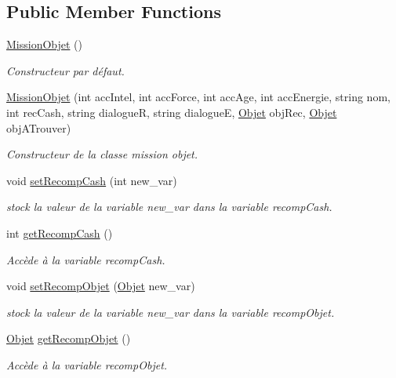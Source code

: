 \subsection*{Public Member Functions}
\begin{DoxyCompactItemize}
\item 
\hyperlink{class_mission_objet_a318a1e74b1c2fb4a5c4f9e8c1307cb5d}{Mission\-Objet} ()
\begin{DoxyCompactList}\small\item\em Constructeur par défaut. \end{DoxyCompactList}\item 
\hyperlink{class_mission_objet_a3622eac0551933b75a5d11c93ceba22f}{Mission\-Objet} (int acc\-Intel, int acc\-Force, int acc\-Age, int acc\-Energie, string nom, int rec\-Cash, string dialogue\-R, string dialogue\-E, \hyperlink{class_objet}{Objet} obj\-Rec, \hyperlink{class_objet}{Objet} obj\-A\-Trouver)
\begin{DoxyCompactList}\small\item\em Constructeur de la classe mission objet. \end{DoxyCompactList}\item 
void \hyperlink{class_mission_objet_ac8de7ea7c712f4f5db299909043a18b9}{set\-Recomp\-Cash} (int new\-\_\-var)
\begin{DoxyCompactList}\small\item\em stock la valeur de la variable new\-\_\-var dans la variable recomp\-Cash. \end{DoxyCompactList}\item 
int \hyperlink{class_mission_objet_af488361b1557fe4443494479fb5b1861}{get\-Recomp\-Cash} ()
\begin{DoxyCompactList}\small\item\em Accède à la variable recomp\-Cash. \end{DoxyCompactList}\item 
void \hyperlink{class_mission_objet_a0c3e3707924333f8de5b236d172191de}{set\-Recomp\-Objet} (\hyperlink{class_objet}{Objet} new\-\_\-var)
\begin{DoxyCompactList}\small\item\em stock la valeur de la variable new\-\_\-var dans la variable recomp\-Objet. \end{DoxyCompactList}\item 
\hyperlink{class_objet}{Objet} \hyperlink{class_mission_objet_a2bf5716c0c4cb7b6a9239af4c083d26d}{get\-Recomp\-Objet} ()
\begin{DoxyCompactList}\small\item\em Accède à la variable recomp\-Objet. \end{DoxyCompactList}\item 

\end{DoxyCompactItemize}
